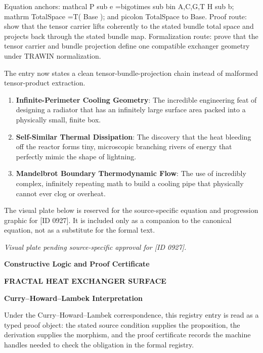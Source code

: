 Equation anchors: mathcal P sub e =bigotimes sub bin A,C,G,T H sub b; mathrm TotalSpace =T( Base ); and picolon TotalSpace to Base. Proof route: show that the tensor carrier lifts coherently to the stated bundle total space and projects back through the stated bundle map. Formalization route: prove that the tensor carrier and bundle projection define one compatible exchanger geometry under TRAWIN normalization.

The entry now states a clean tensor-bundle-projection chain instead of malformed tensor-product extraction.
\endgroup

\begin{enumerate}[leftmargin=1.6em,itemsep=6pt,topsep=4pt]
\item \textbf{Infinite-Perimeter Cooling Geometry}: The incredible engineering feat of designing a radiator that has an infinitely large surface area packed into a physically small, finite box.
\item \textbf{Self-Similar Thermal Dissipation}: The discovery that the heat bleeding off the reactor forms tiny, microscopic branching rivers of energy that perfectly mimic the shape of lightning.
\item \textbf{Mandelbrot Boundary Thermodynamic Flow}: The use of incredibly complex, infinitely repeating math to build a cooling pipe that physically cannot ever clog or overheat.
\end{enumerate}

\begingroup\footnotesize\sloppy
The visual plate below is reserved for the source-specific equation and progression graphic for [ID 0927]. It is included only as a companion to the canonical equation, not as a substitute for the formal text.
\par\endgroup
\begingroup\footnotesize\itshape
Visual plate pending source-specific approval for [ID 0927].
\par\endgroup

\clearpage
\begingroup\tzpsupportsetup
\noindent\textbf{\fontsize{10.8pt}{12.8pt}\selectfont [ID 0927] Constructive Logic and Proof Certificate}\par
\noindent\textbf{\fontsize{10pt}{12pt}\selectfont FRACTAL HEAT EXCHANGER SURFACE}\par
\vspace{0.45em}
\begingroup
\footnotesize
\setlength{\parskip}{0.22em}
\setlength{\parindent}{0pt}
\noindent\textbf{Curry--Howard--Lambek Interpretation}\par
Under the Curry--Howard--Lambek correspondence, this registry entry is read as a typed proof
object: the stated source condition supplies the proposition, the derivation supplies the
morphism, and the proof certificate records the machine handles needed to check the obligation
in the formal registry.

